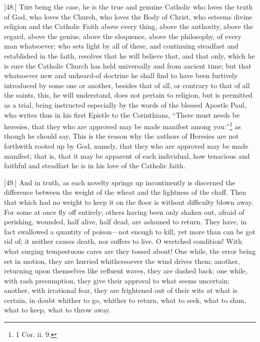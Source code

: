[48.] \textsc{This} being the case, he is the true and genuine Catholic who loves the truth of God, who loves the Church, who loves the Body of Christ, who esteems divine religion and the Catholic Faith above every thing, above the authority, above the regard, above the genius, above the eloquence, above the philosophy, of every man whatsoever; who sets light by all of these, and continuing steadfast and established in the faith, resolves that he will believe that, and that only, which he is sure the Catholic Church has held universally and from ancient time; but that whatsoever new and unheard-of doctrine he shall find to have been furtively introduced by some one or another, besides that of all, or contrary to that of all the saints, this, he will understand, does not pertain to religion, but is permitted as a trial, being instructed especially by the words of the blessed Apostle Paul, who writes thus in his first Epistle to the Corinthians, “There must needs be heresies, that they who are approved may be made manifest among you:”\footnote{1 Cor. ii. 9.} as though he should say, This is the reason why the authors of Heresies are not forthwith rooted up by God, namely, that they who are approved may be made manifest; that is, that it may be apparent of each individual, how tenacious and faithful and steadfast he is in his love of the Catholic faith.

[49.] And in truth, as each novelty springs up incontinently is discerned the difference between the weight of the wheat and the lightness of the chaff. Then that which had no weight to keep it on the floor is without difficulty blown away. For some at once fly off entirely; others having been only shaken out, afraid of perishing, wounded, half alive, half dead, are ashamed to return. They have, in fact swallowed a quantity of poison—not enough to kill, yet more than can be got rid of; it neither causes death, nor suffers to live. O wretched condition! With what surging tempestuous cares are they tossed about! One while, the error being set in motion, they are hurried whithersoever the wind drives them; another, returning upon themselves like refluent waves, they are dashed back: one while, with rash presumption, they give their approval to what seems uncertain; another, with irrational fear, they are frightened out of their wits at what is certain, in doubt whither to go, whither to return, what to seek, what to shun, what to keep, what to throw away.

